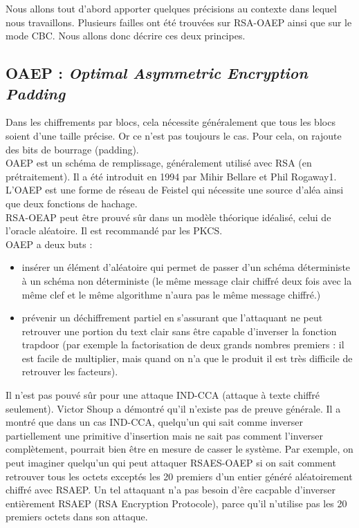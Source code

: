 Nous allons tout d'abord apporter quelques précisions au contexte dans lequel nous travaillons. Plusieurs failles ont été trouvées sur RSA-OAEP ainsi que sur le mode CBC. Nous allons donc décrire ces deux principes.
\subsection{OAEP : \textit{Optimal Asymmetric Encryption Padding}}
Dans les chiffrements par blocs, cela nécessite généralement que tous les blocs soient d'une taille précise. Or ce n'est pas toujours le cas. Pour cela, on rajoute des bits de bourrage (padding).\\
OAEP est un schéma de remplissage, généralement utilisé avec RSA (en prétraitement). Il a été introduit en 1994 par Mihir Bellare et Phil Rogaway1. L'OAEP est une forme de réseau de Feistel qui nécessite une source d'aléa ainsi que deux fonctions de hachage.\\
RSA-OEAP peut être prouvé sûr dans un modèle théorique idéalisé, celui de l'oracle aléatoire. Il est recommandé par les PKCS.\\
OAEP a deux buts : 
\begin{itemize}
	\item insérer un élément d'aléatoire qui permet de passer d'un schéma déterministe à un schéma non déterministe (le même message clair chiffré deux fois avec la même clef et le même algorithme n'aura pas le même message chiffré.)
	\item prévenir un déchiffrement partiel en s'assurant que l'attaquant ne peut retrouver une portion du text clair sans être capable d'inverser la fonction trapdoor (par exemple la factorisation de deux grands nombres premiers : il est facile de multiplier, mais quand on n'a que le produit  il est très difficile de retrouver les facteurs).\\
\end{itemize}
Il n'est pas pouvé sûr pour une attaque IND-CCA (attaque à texte chiffré seulement). Victor Shoup a démontré qu'il n'existe pas de preuve générale.
Il a montré que dans un cas IND-CCA, quelqu'un qui sait comme inverser partiellement une primitive d'insertion mais ne sait pas comment l'inverser complètement, pourrait bien être en mesure de casser le système. Par exemple, on peut imaginer quelqu'un qui peut attaquer RSAES-OAEP si on sait comment retrouver tous les octets exceptés les 20 premiers d'un entier généré aléatoirement chiffré avec RSAEP. Un tel attaquant n'a pas besoin d'êre cacpable d'inverser entièrement RSAEP (RSA Encryption Protocole), parce qu'il n'utilise pas les 20 premiers octets dans son attaque.

